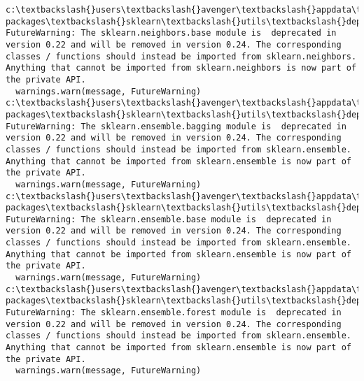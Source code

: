 \documentclass[11pt]{article}
\begin{document}
    \begin{Verbatim}[commandchars=\\\{\}]
c:\textbackslash{}users\textbackslash{}avenger\textbackslash{}appdata\textbackslash{}local\textbackslash{}programs\textbackslash{}python\textbackslash{}python36\textbackslash{}lib\textbackslash{}site-packages\textbackslash{}sklearn\textbackslash{}utils\textbackslash{}deprecation.py:144: FutureWarning: The sklearn.neighbors.base module is  deprecated in version 0.22 and will be removed in version 0.24. The corresponding classes / functions should instead be imported from sklearn.neighbors. Anything that cannot be imported from sklearn.neighbors is now part of the private API.
  warnings.warn(message, FutureWarning)
c:\textbackslash{}users\textbackslash{}avenger\textbackslash{}appdata\textbackslash{}local\textbackslash{}programs\textbackslash{}python\textbackslash{}python36\textbackslash{}lib\textbackslash{}site-packages\textbackslash{}sklearn\textbackslash{}utils\textbackslash{}deprecation.py:144: FutureWarning: The sklearn.ensemble.bagging module is  deprecated in version 0.22 and will be removed in version 0.24. The corresponding classes / functions should instead be imported from sklearn.ensemble. Anything that cannot be imported from sklearn.ensemble is now part of the private API.
  warnings.warn(message, FutureWarning)
c:\textbackslash{}users\textbackslash{}avenger\textbackslash{}appdata\textbackslash{}local\textbackslash{}programs\textbackslash{}python\textbackslash{}python36\textbackslash{}lib\textbackslash{}site-packages\textbackslash{}sklearn\textbackslash{}utils\textbackslash{}deprecation.py:144: FutureWarning: The sklearn.ensemble.base module is  deprecated in version 0.22 and will be removed in version 0.24. The corresponding classes / functions should instead be imported from sklearn.ensemble. Anything that cannot be imported from sklearn.ensemble is now part of the private API.
  warnings.warn(message, FutureWarning)
c:\textbackslash{}users\textbackslash{}avenger\textbackslash{}appdata\textbackslash{}local\textbackslash{}programs\textbackslash{}python\textbackslash{}python36\textbackslash{}lib\textbackslash{}site-packages\textbackslash{}sklearn\textbackslash{}utils\textbackslash{}deprecation.py:144: FutureWarning: The sklearn.ensemble.forest module is  deprecated in version 0.22 and will be removed in version 0.24. The corresponding classes / functions should instead be imported from sklearn.ensemble. Anything that cannot be imported from sklearn.ensemble is now part of the private API.
  warnings.warn(message, FutureWarning)

\end{Verbatim}
\end{document}

